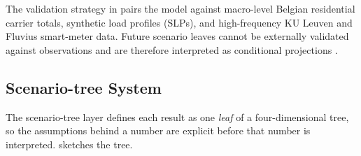 The validation strategy in  pairs the model against macro-level Belgian residential carrier totals, synthetic load profiles (SLPs), and high-frequency KU Leuven and Fluvius smart-meter data. Future scenario leaves cannot be externally validated against observations and are therefore interpreted as conditional projections \cite{IPCC2021}.


\subsection{Scenario-tree System}
\label{sec:scenarioTreeSystem}
 
The scenario-tree layer defines each result as one \emph{leaf} of a four-dimensional tree, so the assumptions behind a number are explicit before that number is interpreted.  sketches the tree.
 
